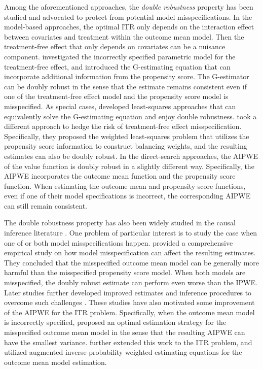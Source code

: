 \documentclass[11pt]{article}
\theoremstyle{definition}
\theoremstyle{remark}
\begin{document}
Among the aforementioned approaches, the \textit{double robustness} property has been studied and advocated to protect from potential model misspecifications. In the model-based approaches, the optimal ITR only depends on the interaction effect between covariates and treatment within the outcome mean model. Then the treatment-free effect that only depends on covariates can be a nuisance component. \citet{robins2004optimal} investigated the incorrectly specified parametric model for the treatment-free effect, and introduced the G-estimating equation that can incorporate additional information from the propensity score. The G-estimator can be doubly robust in the sense that the estimate remains consistent even if one of the treatment-free effect model and the propensity score model is misspecified. As special cases, \citet{lu2013variable,ertefaie2021robust} developed least-squares approaches that can equivalently solve the G-estimating equation and enjoy double robustness.  \citet{wallace2015doubly,meng2020robust} took a different approach to hedge the risk of treatment-free effect misspecification. Specifically, they proposed the weighted least-squares problem that utilizes the propensity score information to construct balancing weights, and the resulting estimates can also be doubly robust. In the direct-search approaches, the AIPWE of the value function is doubly robust in a slightly different way. Specifically, the AIPWE incorporates the outcome mean function and the propensity score function. When estimating the outcome mean and propensity score functions, even if one of their model specifications is incorrect, the corresponding AIPWE can still remain consistent.

The double robustness property has also been widely studied in the causal inference literature \citep{robins1994estimation,robins1995analysis,ding2018causal}. One problem of particular interest is to study the case when one of or both model misspecifications happen. \citet{kang2007demystifying} provided a comprehensive empirical study on how model misspecification can affect the resulting estimates. They concluded that the misspecified outcome mean model can be generally more harmful than the misspecified propensity score model. When both models are misspecified, the doubly robust estimate can perform even worse than the IPWE. Later studies further developed improved estimates and inference procedures to overcome such challenges \citep{tan2010bounded,rotnitzky2012improved,vermeulen2015bias,benkeser2017doubly}. These studies have also motivated some improvement of the AIPWE for the ITR problem. Specifically, when the outcome mean model is incorrectly specified, \citet{cao2009improving} proposed an optimal estimation strategy for the misspecified outcome mean model in the sense that the resulting AIPWE can have the smallest variance. \citet{pan2021improved} further extended this work to the ITR problem, and utilized augmented inverse-probability weighted estimating equations for the outcome mean model estimation.
\end{document}
